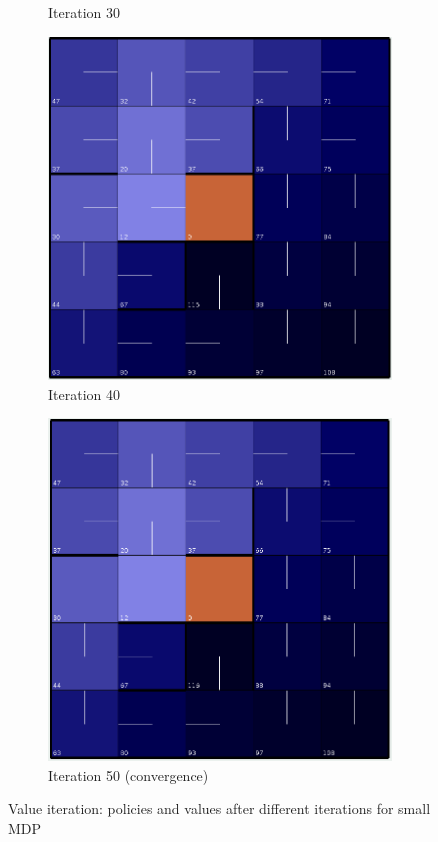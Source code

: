 \documentclass[letterpaper]{article}
\begin{document}
\begin{figure}
\begin{subfigure}[t]{.18\textwidth}
			\caption{Iteration 30}
		\end{subfigure}
		\begin{subfigure}[t]{.18\textwidth}
			\centering
			\includegraphics[width=\linewidth]{images/small_vi_40}
			\caption{Iteration 40}
		\end{subfigure}
		\begin{subfigure}[t]{.18\textwidth}
			\centering
			\includegraphics[width=\linewidth]{images/small_vi}
			\caption{Iteration 50 (convergence)}
		\end{subfigure}
		\caption{Value iteration: policies and values after different iterations for small MDP}
		\label{fig:mdp-vi-iter-small}%
	\end{figure}%
\end{document}

